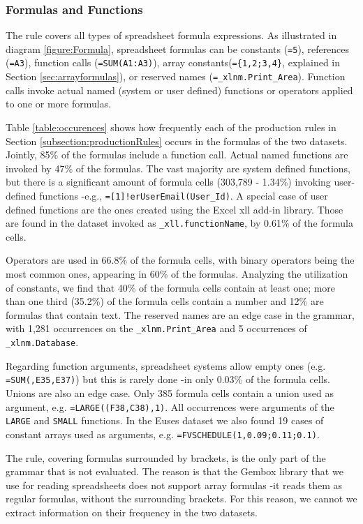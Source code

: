 \documentclass[conference]{IEEEtran}
\begin{document}
\subsubsection{Formulas and Functions}

The  rule covers all types of spreadsheet formula expressions. As illustrated in diagram \ref{figure:Formula}, spreadsheet formulas can be constants (\texttt{=5}), references (\texttt{=A3}), function calls (\texttt{=SUM(A1:A3)}), array constants(\texttt{=\{1,2;3,4\}}, explained in Section \ref{sec:arrayformulas}), or reserved names (\texttt{=_xlnm.Print_Area}). Function calls invoke actual named (system or user defined) functions or operators applied to one or more formulas. 

Table \ref{table:occurences} shows how frequently each of the production rules in Section \ref{subsection:productionRules} occurs in the formulas of the two datasets. Jointly, 85\% of the formulas include a function call. Actual named functions are invoked by 47\% of the formulas. The vast majority are system defined functions, but there is a significant amount of formula cells (303,789 - 1.34\%) invoking user-defined functions -e.g., \texttt{=[1]!erUserEmail(User_Id)}. A special case of user defined functions are the ones created using the Excel xll add-in library. Those are found in the dataset invoked as \texttt{_xll.functionName}, by 0.61\% of the formula cells.

Operators are used in 66.8\% of the formula cells, with binary operators being the most common ones, appearing in 60\% of the formulas. Analyzing the utilization of constants, we find that 40\% of the formula cells contain at least one; more than one third (35.2\%) of the formula cells contain a number and 12\% are formulas that contain text. The reserved names are an edge case in the grammar, with 1,281 occurrences on the \texttt{_xlnm.Print_Area} and 5 occurrences of  \texttt{_xlnm.Database}.

Regarding function arguments, spreadsheet systems allow empty ones (e.g. \texttt{=SUM(,E35,E37)}) but this is rarely done -in only 0.03\% of the formula cells. Unions are also an edge case. Only 385 formula cells contain a union used as argument, e.g. \texttt{=LARGE((F38,C38),1)}. All occurrences were arguments of the \texttt{LARGE} and \texttt{SMALL} functions. In the Euses dataset we also found 19 cases of constant arrays used as arguments, e.g. \texttt{=FVSCHEDULE(1,{0.09;0.11;0.1})}.

The  rule, covering formulas surrounded by brackets, is the only part of the grammar that is not evaluated. The reason is that the Gembox library that we use for reading spreadsheets does not support array formulas -it reads them as regular formulas, without the surrounding brackets. For this reason, we cannot we extract information on their frequency in the two datasets.
\end{document}
